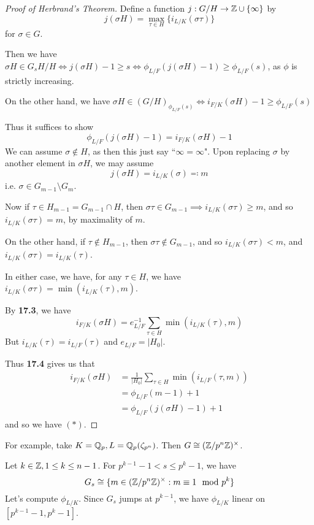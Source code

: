 \documentclass[10pt,a4paper]{article}
\begin{document}
\begin{proof}[Proof of Herbrand's Theorem]
  Define a function $j:G/H \to \mathbb{Z}\cup \{\infty\}$ by
  \[j(\sigma H) = \max_{\tau \in H}\{i_{L/K}(\sigma \tau)\}\]
  for $\sigma \in G$.

  Then we have $\sigma H \in G_sH/H \iff j(\sigma H)-1 \geq s \iff \phi_{L/F}(j(\sigma H) - 1) \geq \phi_{L/F}(s)$, as $\phi$ is strictly increasing.

  On the other hand, we have $\sigma H \in (G/H)_{\phi_{L/F}(s)} \iff i_{F/K}(\sigma H) - 1 \geq \phi_{L/F}(s)$

  Thus it suffices to show
  \[\phi_{L/F}(j(\sigma H)-1) = i_{F/K}(\sigma H) - 1 \tag{$\ast$}\]
  We can assume $\sigma \notin H$, as then this just say ``$\infty=\infty$". Upon replacing $\sigma$ by another element in $\sigma H$, we may assume
  \[j(\sigma H) = i_{L/K}(\sigma) \eqqcolon m\]
  i.e. $\sigma \in G_{m-1}\setminus G_m$.

  Now if $\tau \in H_{m-1} = G_{m-1}\cap H$, then $\sigma \tau \in G_{m-1} \implies i_{L/K}(\sigma \tau) \geq m$, and so $i_{L/K}(\sigma \tau) = m$, by maximality of $m$.

  On the other hand, if $\tau \notin H_{m-1}$, then $\sigma\tau \notin G_{m-1}$, and so $i_{L/K}(\sigma \tau) < m$, and $i_{L/K}(\sigma \tau) = i_{L/K}(\tau)$.

  In either case, we have, for any $\tau \in H$, we have $i_{L/K}(\sigma \tau) = \min(i_{L/K}(\tau), m)$.

  By \textbf{17.3}, we have
  \[i_{F/K}(\sigma H) = e_{L/F}^{-1}\sum_{\tau \in H}\min(i_{L/K}(\tau), m)\]
  But $i_{L/K}(\tau) = i_{L/F}(\tau)$ and $e_{L/F} = |H_0|$.

  Thus \textbf{17.4} gives us that
  \begin{align*}
    i_{F/K}(\sigma H) &= \frac{1}{|H_0|}\sum_{\tau \in H} \min(i_{L/F}(\tau, m))\\
    &= \phi_{L/F}(m-1)+1\\
    &= \phi_{L/F}(j(\sigma H)-1)+1
  \end{align*}
  and so we have $(\ast)$.
\end{proof}
For example, take $K = \mathbb{Q}_p, L = \mathbb{Q}_p(\zeta_{p^n})$. Then $G \cong (\mathbb{Z}/p^n\mathbb{Z})^\times$.

Let $k \in \mathbb{Z}, 1 \leq k \leq n-1$. For $p^{k-1}-1 < s \leq p^{k}-1$, we have
\[G_s \cong \{m \in (\mathbb{Z}/p^n\mathbb{Z})^\times: m \equiv 1 \mod p^k\}\]
Let's compute $\phi_{L/K}$. Since $G_s$ jumps at $p^{k-1}$, we have $\phi_{L/K}$ linear on $[p^{k-1}-1, p^k-1]$.
\end{document}
